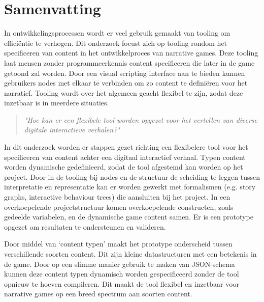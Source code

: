 \chapter*{Samenvatting}
In ontwikkelingsprocessen wordt er veel gebruik gemaakt van tooling om efficiëntie te verhogen. Dit onderzoek focust zich op tooling rondom het specificeren van content in het ontwikkelproces van narrative games. Deze tooling laat mensen zonder programmeerkennis content specificeren die later in de game getoond zal worden. Door een visual scripting interface aan te bieden kunnen gebruikers nodes met elkaar te verbinden om zo content te definiëren voor het narratief.
Tooling wordt over het algemeen geacht flexibel te zijn, zodat deze inzetbaar is in meerdere situaties.
\begin{quote} 
    \centering
    \large
    \textit{
        "Hoe kan er een flexibele tool worden opgezet voor het vertellen van diverse digitale interactieve verhalen?"
    }
\end{quote}

\noindent In dit onderzoek worden er stappen gezet richting een flexibelere tool voor het specificeren van content achter een digitaal interactief verhaal. Typen content worden dynamische gedefinieerd, zodat de tool afgestemd kan worden op het project. Door in de tooling bij nodes en de structuur de scheiding te leggen tussen interpretatie en representatie kan er worden gewerkt met formalismen (e.g. story graphs, interactive behaviour trees) die aansluiten bij het project. In een overkoepelende projectstructuur komen overkoepelende constructen, zoals gedeelde variabelen, en de dynamische game content samen. Er is een prototype opgezet om resultaten te ondersteunen en valideren.
%

Door middel van ‘content typen’ maakt het prototype onderscheid tussen verschillende soorten content. Dit zijn kleine datastructuren met een betekenis in de game. Door op een slimme manier gebruik te maken van JSON-schema kunnen deze content typen dynamisch worden gespecificeerd zonder de tool opnieuw te hoeven compileren. Dit maakt de tool flexibel en inzetbaar voor narrative games op een breed spectrum aan soorten content.

